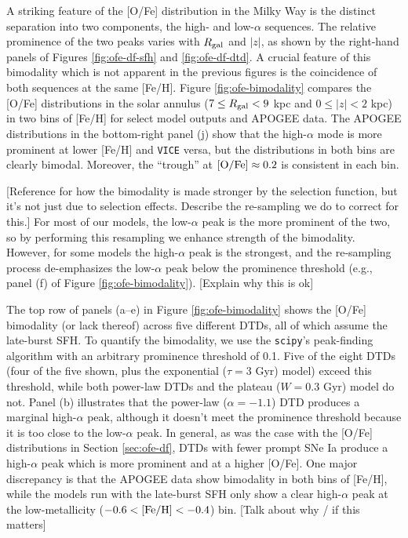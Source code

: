 \documentclass[twocolumn,twocolappendix,linenumbers,trackchanges]{aastex631}
\newcommand{\vice}{{\tt VICE}\xspace}
\begin{document}
A striking feature of the [O/Fe] distribution in the Milky Way is the distinct separation into two components, the high- and low-$\alpha$ sequences. The relative prominence of the two peaks varies with $R_{\rm gal}$ and $|z|$, as shown by the right-hand panels of Figures \ref{fig:ofe-df-sfh} and \ref{fig:ofe-df-dtd}. A crucial feature of this bimodality which is not apparent in the previous figures is the coincidence of both sequences at the same [Fe/H]. Figure \ref{fig:ofe-bimodality} compares the [O/Fe] distributions in the solar annulus ($7\leq R_{\rm gal}<9$ kpc and $0\leq|z|<2$ kpc) in two bins of [Fe/H] for select model outputs and APOGEE data. The APOGEE distributions in the bottom-right panel (j) show that the high-$\alpha$ mode is more prominent at lower [Fe/H] and \vice versa, but the distributions in both bins are clearly bimodal. Moreover, the ``trough'' at ${\rm [O/Fe]}\approx0.2$ is consistent in each bin.

[Reference \citet{Vincenzo2021-AlphaDistribution} for how the bimodality is made stronger by the selection function, but it's not just due to selection effects. Describe the re-sampling we do to correct for this.] For most of our models, the low-$\alpha$ peak is the more prominent of the two, so by performing this resampling we enhance strength of the bimodality. However, for some models the high-$\alpha$ peak is the strongest, and the re-sampling process de-emphasizes the low-$\alpha$ peak below the prominence threshold (e.g., panel (f) of Figure \ref{fig:ofe-bimodality}). [Explain why this is ok]

The top row of panels (a--e) in Figure \ref{fig:ofe-bimodality} shows the [O/Fe] bimodality (or lack thereof) across five different DTDs, all of which assume the late-burst SFH. To quantify the bimodality, we use the {\tt scipy}'s \citep{2020SciPy-NMeth} peak-finding algorithm with an arbitrary prominence threshold of 0.1. Five of the eight DTDs (four of the five shown, plus the exponential ($\tau=3$ Gyr) model) exceed this threshold, while both power-law DTDs and the plateau ($W=0.3$ Gyr) model do not. Panel (b) illustrates that the power-law ($\alpha=-1.1$) DTD produces a marginal high-$\alpha$ peak, although it doesn't meet the prominence threshold because it is too close to the low-$\alpha$ peak. In general, as was the case with the [O/Fe] distributions in Section \ref{sec:ofe-df}, DTDs with fewer prompt SNe Ia produce a high-$\alpha$ peak which is more prominent and at a higher [O/Fe]. One major discrepancy is that the APOGEE data show bimodality in both bins of [Fe/H], while the models run with the late-burst SFH only show a clear high-$\alpha$ peak at the low-metallicity ($-0.6<{\rm [Fe/H]}<-0.4$) bin. [Talk about why / if this matters]
\end{document}
